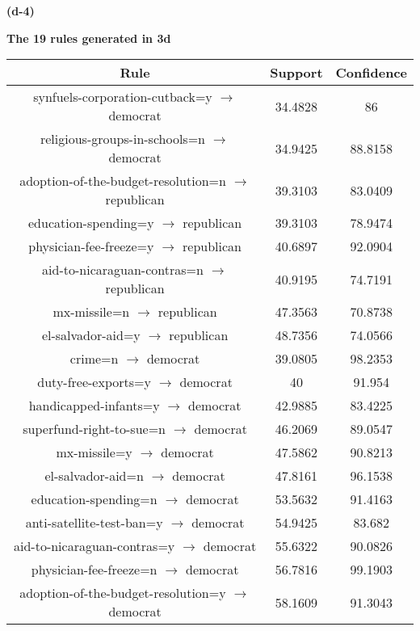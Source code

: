 \documentclass[11pt]{scrartcl}
\begin{document}
\textbf{(d-4)}
\begin{center}
\textbf{The 19 rules generated in 3d}\\
\end{center}
\begin{tabular}{|c|c|c|}
	\hline
	Rule & Support & Confidence\\ \hline
	synfuels-corporation-cutback=y	$\rightarrow$	democrat	&	34.4828	&	86	\\ \hline
	religious-groups-in-schools=n	$\rightarrow$	democrat	&	34.9425	&	88.8158	\\ \hline
	adoption-of-the-budget-resolution=n	$\rightarrow$	republican	&	39.3103	&	83.0409	\\ \hline
	education-spending=y	$\rightarrow$	republican	&	39.3103	&	78.9474	\\ \hline
	physician-fee-freeze=y	$\rightarrow$	republican	&	40.6897	&	92.0904	\\ \hline
	aid-to-nicaraguan-contras=n	$\rightarrow$	republican	&	40.9195	&	74.7191	\\ \hline
	mx-missile=n	$\rightarrow$	republican	&	47.3563	&	70.8738	\\ \hline
	el-salvador-aid=y	$\rightarrow$	republican	&	48.7356	&	74.0566	\\ \hline
	crime=n	$\rightarrow$	democrat	&	39.0805	&	98.2353	\\ \hline
	duty-free-exports=y	$\rightarrow$	democrat	&	40	&	91.954	\\ \hline
	handicapped-infants=y	$\rightarrow$	democrat	&	42.9885	&	83.4225	\\ \hline
	superfund-right-to-sue=n	$\rightarrow$	democrat	&	46.2069	&	89.0547	\\ \hline
	mx-missile=y	$\rightarrow$	democrat	&	47.5862	&	90.8213	\\ \hline
	el-salvador-aid=n	$\rightarrow$	democrat	&	47.8161	&	96.1538	\\ \hline
	education-spending=n	$\rightarrow$	democrat	&	53.5632	&	91.4163	\\ \hline
	anti-satellite-test-ban=y	$\rightarrow$	democrat	&	54.9425	&	83.682	\\ \hline
	aid-to-nicaraguan-contras=y	$\rightarrow$	democrat	&	55.6322	&	90.0826	\\ \hline
	physician-fee-freeze=n	$\rightarrow$	democrat	&	56.7816	&	99.1903	\\ \hline
	adoption-of-the-budget-resolution=y	$\rightarrow$	democrat	&	58.1609	&	91.3043	\\ \hline
\end{tabular}\\
\end{document}
